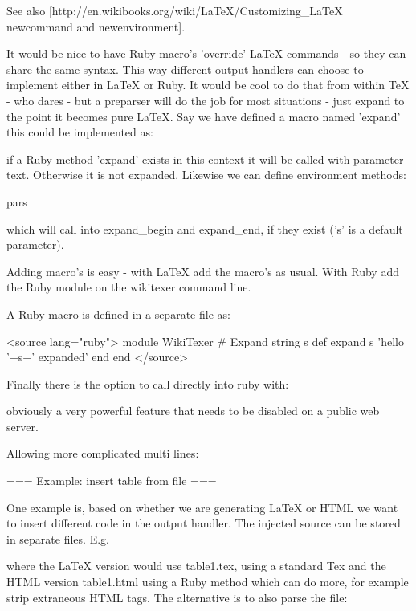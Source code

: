 See also [http://en.wikibooks.org/wiki/LaTeX/Customizing_LaTeX newcommand and newenvironment].

It would be nice to have Ruby macro's 'override' LaTeX commands - so
they can share the same syntax. This way different output handlers can
choose to implement either in LaTeX or Ruby. It would be cool to do
that from within TeX - who dares - but a preparser will do the job for
most situations - just expand to the point it becomes pure LaTeX. Say
we have defined a macro named 'expand' this could be implemented as:


if a Ruby method 'expand' exists in this context it will be called
with parameter text. Otherwise it is not expanded. Likewise we can 
define environment methods:

  \begin{expand}[s]{pars}
	\end{expand}

which will call into expand_begin and expand_end, if they exist ('s'
is a default parameter).

Adding macro's is easy - with LaTeX add the macro's as usual. With
Ruby add the Ruby module on the wikitexer command line.

A Ruby macro is defined in a separate file as:

<source lang="ruby">
  module WikiTexer
		# Expand string s
		def expand s
			'hello '+s+' expanded'
		end
	end
</source>

Finally there is the option to call directly into ruby with:


obviously a very powerful feature that needs to be disabled on a public web server.

Allowing more complicated multi lines:



=== Example: insert table from file ===
  
One example is, based on whether we are generating LaTeX or HTML we
want to insert different code in the output handler. The injected
source can be stored in separate files. E.g.


where the LaTeX version would use table1.tex, using a standard Tex
 and the HTML version table1.html using a Ruby method
which can do more, for example strip extraneous HTML tags. The
alternative is to also parse the file:

